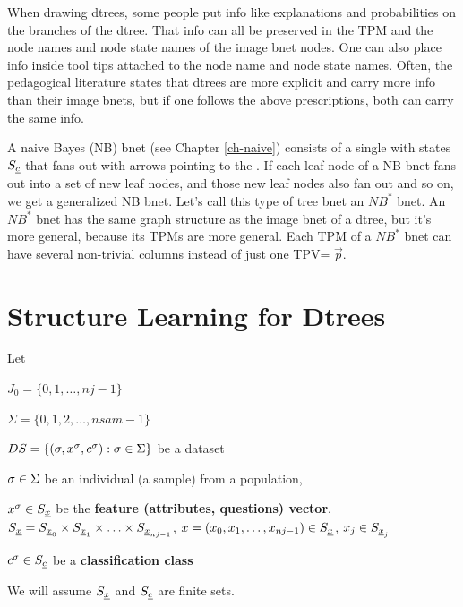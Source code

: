 When drawing dtrees,
some people put
info 
like explanations 
and probabilities on the
branches
of  the dtree.
That
info can all
be preserved
in the TPM
and  the
node names and
 node state names
of the image bnet nodes.
One can also place info
inside tool tips attached to
the node name and node state names.
Often,
the pedagogical literature
states that 
dtrees are more explicit and  
carry
more info than their
image bnets,
but if one 
follows the above
prescriptions,
both can carry
the same info.



A naive Bayes (NB) bnet 
(see Chapter \ref{ch-naive})
consists of a single 
with states $S_\rvc$ that fans
out with arrows 
pointing to the
.
If each leaf node
of a NB bnet
fans out into 
a set of new leaf
nodes, and those new
leaf nodes
also
fan out
and so on,
we get a 
generalized NB bnet.
Let's call
this type of tree bnet an $NB^*$ bnet.
An $NB^*$ bnet
has the same graph structure
as the image bnet of a dtree,
but it's more general,
because its 
TPMs are more general. 
Each 
TPM of a $NB^*$ bnet
 can have several non-trivial
columns instead of just one
TPV= $\vec{p}$.


\section{Structure Learning for  Dtrees}\label{sec-dtree-sl}



Let

$J_0=\{0,1, \ldots, nj-1\}$

$\Sigma=\{0,1,2, \ldots,nsam-1\}$

$DS=\{(\sigma, x^\sigma, c^\sigma): \sigma\in \Sigma\}$ be a dataset

$\sigma\in \Sigma$ be an individual (a sample)
from a population, 

$x^\s\in S_\rvx$ be the {\bf
feature (attributes, questions) vector}.
$S_\rvx= S_{\rvx_0}\times S_{\rvx_1}
\times\ldots\times S_{\rvx_{nj-1}}$,
$x=(x_0, x_1, \ldots, x_{nj-1})\in S_\rvx$, 
$x_j\in S_{\rvx_j}$


$c^\s\in S_\rvc$ be a {\bf classification class}

We will
assume $S_\rvx$ and $S_\rvc$ are finite sets.

